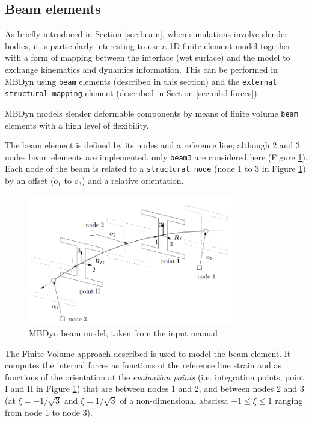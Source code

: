 \subsection{Beam elements}
\label{sec:mbd-beam}

As briefly introduced in Section \ref{sec:beam}, when simulations involve slender bodies, it is particularly interesting to use a 1D finite element model together with a form of mapping between the interface (wet surface) and the model to exchange kinematics and dynamics information. This can be performed in MBDyn using \texttt{beam} elements (described in this section) and the \texttt{external structural mapping} element (described in Section \ref{sec:mbd-forces}).

MBDyn models slender deformable components by means of finite volume \texttt{beam} elements with a high level of flexibility.

The beam element is defined by its nodes and a reference line; although 2 and 3 nodes beam elements are implemented, only \texttt{beam3} are considered here (Figure \ref{fig:mbdyn-beam-model}). Each node of the beam is related to a \texttt{structural node} (node 1 to 3 in Figure \ref{fig:mbdyn-beam-model}) by an offset ($o_1$ to $o_3$) and a relative orientation.

\begin{figure}[htbp!]
	\centering
	\includegraphics[width=0.8\textwidth]{images/beam_model}
	\caption{MBDyn beam model, taken from the input manual}
	\label{fig:mbdyn-beam-model}
\end{figure}


The Finite Volume approach described \cite{ghiringhelli2000multibody} is used to model the beam element. It computes the internal forces as functions of the reference line strain and as functions of the  orientation at the \textit{evaluation points} (i.e. integration points, point I and II in Figure \ref{fig:mbdyn-beam-model}) that are between nodes 1 and 2, and between nodes 2 and 3 (at $\xi =-1/\sqrt{3}$ and $\xi = 1/\sqrt{3}$ of a non-dimensional abscissa $-1\leq \xi \leq 1$ ranging from node 1 to node 3).


